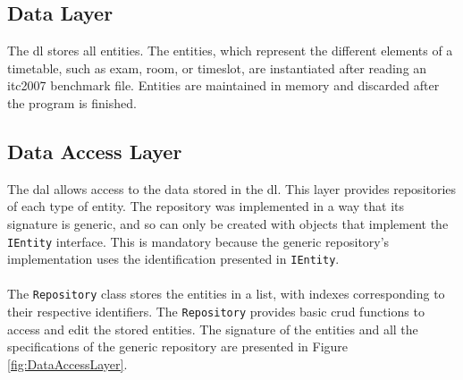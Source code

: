 \subsection{Data Layer}

The \gls{dl} stores all entities. The entities, which represent the different elements of a timetable, such as exam, room, or timeslot, are instantiated after reading an \gls{itc2007} benchmark file. Entities are maintained in memory and discarded after the program is finished.

\subsection{Data Access Layer}

The \gls{dal} allows access to the data stored in the \gls{dl}. This layer provides repositories of each type of entity. The repository was implemented in a way that its signature is generic, and so can only be created with objects that implement the \verb+IEntity+ interface. This is mandatory because the generic repository's implementation uses the identification presented in \verb+IEntity+. \\
\\
The \verb+Repository+ class stores the entities in a list, with indexes corresponding to their respective identifiers. The \verb+Repository+ provides basic \gls{crud} functions to access and edit the stored entities. The signature of the entities and all the specifications of the generic repository are presented in Figure \ref{fig:DataAccessLayer}.\\

